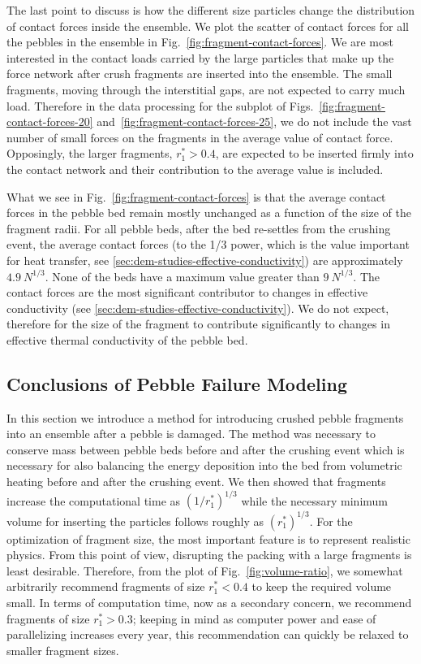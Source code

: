 \FloatBarrier

The last point to discuss is how the different size particles change the distribution of contact forces inside the ensemble. We plot the scatter of contact forces for all the pebbles in the ensemble in Fig.~\ref{fig:fragment-contact-forces}. We are most interested in the contact loads carried by the large particles that make up the force network after crush fragments are inserted into the ensemble. The small fragments, moving through the interstitial gaps, are not expected to carry much load. Therefore in the data processing for the subplot of Figs.~\ref{fig:fragment-contact-forces-20} and~\ref{fig:fragment-contact-forces-25}, we do not include the vast number of small forces on the fragments in the average value of contact force. Opposingly, the larger fragments, $r_1^*>0.4$, are expected to be inserted firmly into the contact network and their contribution to the average value is included.

What we see in Fig.~\ref{fig:fragment-contact-forces} is that the average contact forces in the pebble bed remain mostly unchanged as a function of the size of the fragment radii. For all pebble beds, after the bed re-settles from the crushing event, the average contact forces (to the 1/3 power, which is the value important for heat transfer, see \cref{sec:dem-studies-effective-conductivity}) are approximately $4.9\ N^{1/3}$. None of the beds have a maximum value greater than $9\ N^{1/3}$. The contact forces are the most significant contributor to changes in effective conductivity (see \cref{sec:dem-studies-effective-conductivity}). We do not expect, therefore for the size of the fragment to contribute significantly to changes in effective thermal conductivity of the pebble bed.

\subsection{Conclusions of Pebble Failure Modeling}

In this section we introduce a method for introducing crushed pebble fragments into an ensemble after a pebble is damaged. The method was necessary to conserve mass between pebble beds before and after the crushing event which is necessary for also balancing the energy deposition into the bed from volumetric heating before and after the crushing event. We then showed that fragments increase the computational time as $(1/r_1^*)^{1/3}$ while the necessary minimum volume for inserting the particles follows roughly as $(r_1^*)^{1/3}$. For the optimization of fragment size, the most important feature is to represent realistic physics. From this point of view, disrupting the packing with a large fragments is least desirable. Therefore, from the plot of Fig.~\ref{fig:volume-ratio}, we somewhat arbitrarily recommend fragments of size $r_1^* < 0.4$ to keep the required volume small. In terms of computation time, now as a secondary concern, we recommend fragments of size $r_1^* > 0.3$; keeping in mind as computer power and ease of parallelizing increases every year, this recommendation can quickly be relaxed to smaller fragment sizes.

